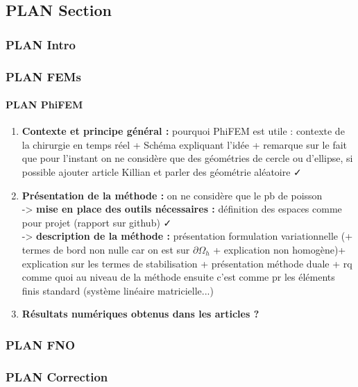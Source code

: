 \documentclass[12pt]{article}
\begin{document}
	\subsection{PLAN Section}

	\subsubsection{PLAN Intro}
	
	\subsubsection{PLAN FEMs}
	
	\paragraph{PLAN PhiFEM}
	\begin{enumerate}[label=\textbullet]
		\item \textbf{Contexte et principe général :} pourquoi PhiFEM est utile : contexte de la chirurgie en temps réel + Schéma expliquant l'idée + remarque sur le fait que pour l'instant on ne considère que des géométries de cercle ou d'ellipse, si possible ajouter article Killian et parler des géométrie aléatoire \color{green}\faCheck\color{black}
		\item \textbf{Présentation de la méthode :} on ne considère que le pb de poisson \\
		-> \textbf{mise en place des outils nécessaires :} définition des espaces comme pour projet (rapport sur github) \color{green}\faCheck\color{black} \\
		-> \textbf{description de la méthode :} présentation formulation variationnelle (+ termes de bord non nulle car on est sur $\partial \Omega_h$ + explication non homogène)+ explication sur les termes de stabilisation + présentation méthode duale + rq comme quoi au niveau de la méthode ensuite c'est comme pr les éléments finis standard (système linéaire matricielle...)
		\item  \textbf{Résultats numériques obtenus dans les articles ?}
	\end{enumerate}

	\subsubsection{PLAN FNO}
	
	\subsubsection{PLAN Correction}
	
\end{document}
